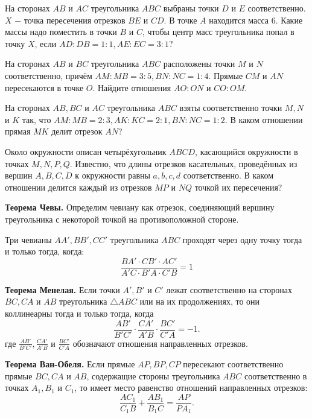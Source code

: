 На сторонах $AB$ и $AC$ треугольника $ABC$ выбраны точки $D$ и $E$ соответственно. $X$ $-$ точка пересечения отрезков $BE$ и $CD$. В точке $A$ находится масса $6$. Какие массы надо поместить в точки $B$ и $C$, чтобы центр масс треугольника попал в точку $X$, если $AD : DB = 1 : 1, AE : EC = 3 : 1?$

На сторонах $AB$ и $BC$ треугольника $ABC$ расположены точки $M$ и $N$ соответственно, причём $AM : MB = 3 : 5, BN : NC = 1 : 4.$ Прямые $CM$ и $AN$ пересекаются в точке $O$. Найдите отношения $AO : ON$ и $CO : OM.$

На сторонах $AB, BC$ и $AC$ треугольника $ABC$ взяты соответственно точки $M, N$ и $K$ так, что $AM : MB = 2 : 3, AK : KC = 2 : 1, BN : NC = 1 : 2.$ В каком отношении прямая $MK$ делит отрезок $AN$?

Около окружности описан четырёхугольник $ABCD$, касающийся окружности в точках $M, N, P, Q.$ Известно, что длины отрезков касательных, проведённых из вершин $A, B, C, D$ к окружности равны $a, b, c, d$ соответственно. В каком отношении делится каждый из отрезков $MP$ и $NQ$ точкой их пересечения?

\textbf{Теорема Чевы.}
Определим чевиану как отрезок, соединяющий вершину треугольника с некоторой точкой на противоположной стороне.

Три чевианы ${\displaystyle AA',BB',CC'}$ треугольника ${\displaystyle ABC}$ проходят через одну точку тогда и только тогда, когда: 
\[{\displaystyle {\frac {BA'\cdot CB'\cdot AC'}{A'C\cdot B'A\cdot C'B}}=1}\]

\textbf{Теорема Менелая.}
Если точки $A', B'$ и $C'$ лежат соответственно на сторонах $BC, CA$ и $AB$ треугольника $\triangle ABC$ или на их продолжениях, то они коллинеарны тогда и только тогда, когда
\[
\frac{AB'}{B'C'} \cdot \frac{CA'}{A'B} \cdot \frac{BC'}{C'A} = -1.
\]
где $\frac{AB'}{B'C'}, \frac{CA'}{A'B}$ и $\frac{BC'}{C'A}$ обозначают отношения направленных отрезков.

\textbf{Теорема Ван-Обеля.}
Если прямые $AP, BP, CP$ пересекают соответственно прямые $BC, CA$ и $AB$, содержащие стороны треугольника $ABC$ соответственно в точках $A_1, B_1$ и $C_1$, то имеет место равенство отношений направленных отрезков:
\[
\frac{AC_1}{C_1B} + \frac{AB_1}{B_1C} = \frac{AP}{PA_1}.
\]